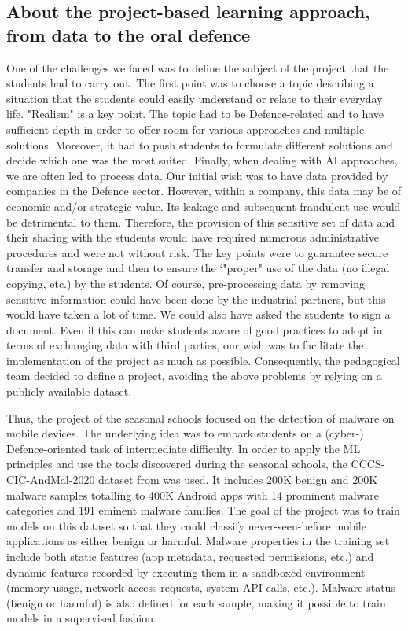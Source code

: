 \documentclass[conference]{IEEEtran}
\begin{document}
\subsection{About the project-based learning approach, from data to the oral defence}
One of the challenges we faced was to define the subject of the project that the students had to carry out. The first point was to choose a topic describing a situation that the students could easily understand or relate to their everyday life. "Realism" is a key point. The topic
had to be Defence-related and to have sufficient depth in order to offer room for various approaches and multiple solutions. Moreover, it had to push students to formulate different solutions and decide which one was the most suited.
Finally, when dealing with AI approaches, we are often led to process data. Our initial wish was to have data provided by companies in the Defence sector. However, within a company, this data may be of economic and/or strategic value. Its leakage and subsequent fraudulent use would be detrimental to them. Therefore, the provision of this sensitive set of data and their sharing with the students would have required numerous administrative procedures and were not without risk. The key points were to guarantee secure transfer and storage and then to ensure the `"proper" use of the data (no illegal copying, etc.) by the students. Of course, pre-processing data by removing sensitive information  could have been done by the industrial partners, but this would have taken a lot of time. We could also have asked the students to sign a document. Even if this can make students aware of good practices to adopt in terms of exchanging data with third parties, our wish was to facilitate the implementation of the project as much as possible. Consequently, the pedagogical team decided to define a project, avoiding the above problems by relying on a publicly available dataset.

\noindent Thus, the project of the seasonal schools focused on the detection of malware on mobile devices. The underlying idea was to embark students on a (cyber-) Defence-oriented task of intermediate difficulty. In order to apply the ML principles and use the tools discovered during the seasonal schools, the CCCS-CIC-AndMal-2020 dataset from \cite{b1,b2,b3} was used. It includes 200K benign and 200K malware samples totalling to 400K Android apps with 14 prominent malware categories and 191 eminent malware families. The goal of the project was to train models on this dataset so that they could classify never-seen-before mobile applications as either benign or harmful. Malware properties in the training set include both static features (app metadata, requested permissions, etc.) and dynamic features recorded by executing them in a sandboxed environment (memory usage, network access requests, system API calls, etc.). Malware status (benign or harmful) is also defined for each sample, making it possible to train models in a supervised fashion.
\end{document}
